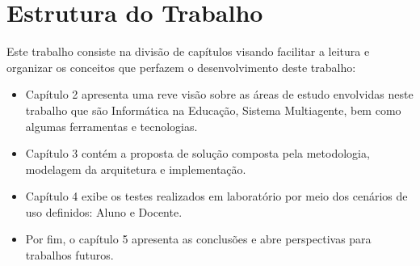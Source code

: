 \section{Estrutura do Trabalho}
Este trabalho consiste na divisão de capítulos visando facilitar a leitura e organizar os conceitos que perfazem o desenvolvimento deste trabalho:
\begin{itemize}
	\item Capítulo 2 apresenta uma reve visão sobre as áreas de estudo envolvidas neste trabalho que são Informática na Educação, Sistema Multiagente, bem como algumas ferramentas e tecnologias.
	\item Capítulo 3 contém a proposta de solução composta pela metodologia, modelagem da arquitetura e implementação.
	\item Capítulo 4 exibe os testes realizados em laboratório por meio dos cenários de uso definidos: Aluno e Docente.
	\item Por fim, o capítulo 5 apresenta as conclusões e abre perspectivas para trabalhos futuros.
\end{itemize}

